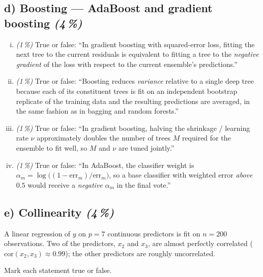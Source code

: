 \documentclass[11pt,a4paper]{article}
\newcommand{\subpoints}[1]{\textit{(#1\,\%)}}
\begin{document}
\subsection*{d) Boosting --- AdaBoost and gradient boosting \subpoints{4}}
\begin{enumerate}[(i)]
  \item \subpoints{1} True or false: ``In gradient boosting with squared-error loss, fitting the next tree to the current residuals is equivalent to fitting a tree to the \emph{negative gradient} of the loss with respect to the current ensemble's predictions.''
  \item \subpoints{1} True or false: ``Boosting reduces \emph{variance} relative to a single deep tree because each of its constituent trees is fit on an independent bootstrap replicate of the training data and the resulting predictions are averaged, in the same fashion as in bagging and random forests.''
  \item \subpoints{1} True or false: ``In gradient boosting, halving the shrinkage / learning rate $\nu$ approximately doubles the number of trees $M$ required for the ensemble to fit well, so $M$ and $\nu$ are tuned jointly.''
  \item \subpoints{1} True or false: ``In AdaBoost, the classifier weight is $\alpha_m = \log\!\bigl((1-\mathrm{err}_m)/\mathrm{err}_m\bigr)$, so a base classifier with weighted error \emph{above} $0.5$ would receive a \emph{negative} $\alpha_m$ in the final vote.''
\end{enumerate}

\subsection*{e) Collinearity \subpoints{4}}
A linear regression of $y$ on $p = 7$ continuous predictors is fit on $n = 200$ observations. Two of the predictors, $x_2$ and $x_3$, are almost perfectly correlated ($\mathrm{cor}(x_2, x_3) \approx 0.99$); the other predictors are roughly uncorrelated.

Mark each statement true or false.
\end{document}
